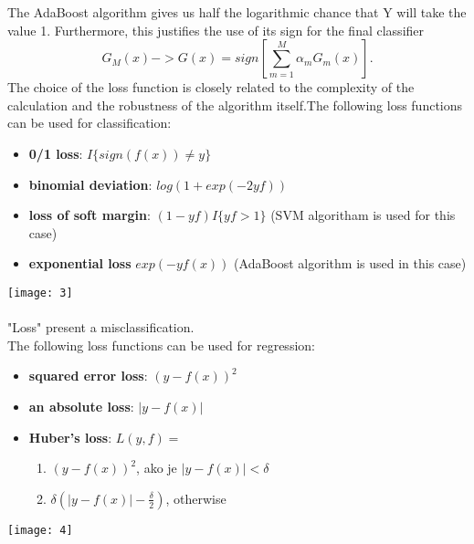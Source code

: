 \documentclass[12pt, letterpaper, twoside]{article}
\begin{document}
The AdaBoost algorithm gives us half the logarithmic chance that Y will take the value 1. Furthermore, this justifies the use of its sign for the final classifier
\begin{equation*}
G_M(x) -> G(x)=sign [\sum_{m=1}^{M}\alpha_m G_m(x)].
\end{equation*}
The choice of the loss function is closely related to the complexity of the calculation and the robustness of the algorithm itself.The following loss functions can be used for classification:
\begin{itemize}
\item \textbf{0/1 loss}: $I\{sign(f(x))\not=y\}$
\item \textbf{binomial deviation}: $log(1+exp(-2yf))$
\item \textbf{loss of soft margin}: $(1-yf)I\{yf>1\}$ (SVM algoritham is used for this case)
\item \textbf{exponential loss} $exp(-yf(x))$ (AdaBoost algorithm is used in this case)
\end{itemize}
\texttt{[image: 3]}
\\\\"Loss" present a misclassification.\\
The following loss functions can be used for regression:\begin{itemize}
\item \textbf{squared error loss}: $(y-f(x))^2$
\item \textbf{an absolute loss}: $|y-f(x)|$
\item \textbf{Huber's loss}: $L(y,f)=$
\begin{enumerate}
\item \hspace*{10ex} $(y-f(x))^2$, ako je $|y-f(x)|<\delta$
\item \hspace*{10ex}$\delta(|y-f(x)|-\frac{\delta}{2})$, otherwise
\end{enumerate}
\end{itemize}  
\texttt{[image: 4]}
\end{document}
